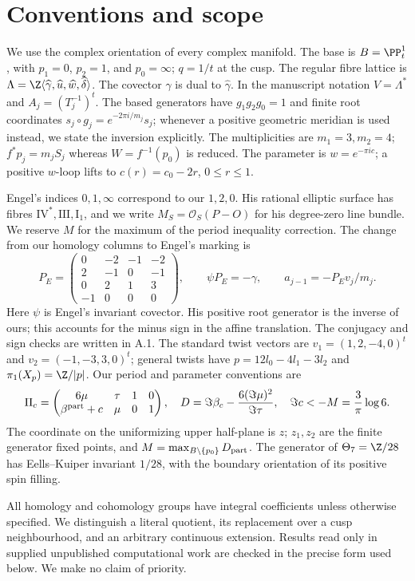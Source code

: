 \section*{Conventions and scope}
\begingroup\small
We use the complex orientation of every complex manifold. The base is
$B=\PP^1_t$, with $p_1=0$, $p_2=1$, and $p_0=\infty$; $q=1/t$ at the cusp.
The regular fibre lattice is
$\Lambda=\Z\langle\widehat\gamma,\widehat u,\widehat w,\widehat\delta\rangle$.
The covector $\gamma$ is dual to $\widehat\gamma$.
In the manuscript notation $V=\Lambda^*$ and $A_j=(T_j^{-1})^t$.
The based generators have $g_1g_2g_0=1$ and finite root coordinates
$s_j\circ g_j=e^{-2\pi i/m_j}s_j$; whenever a positive geometric meridian
is used instead, we state the inversion explicitly.
The multiplicities are $m_1=3,m_2=4$; $f^*p_j=m_jS_j$ whereas $W=f^{-1}(p_0)$
is reduced. The parameter is $w=e^{-\pi i c}$; a positive $w$-loop lifts to
$c(r)=c_0-2r$, $0\leq r\leq1$.

Engel's indices $0,1,\infty$ correspond to our $1,2,0$.
His rational elliptic surface has fibres $\mathrm{IV}^*,\mathrm{III},\mathrm I_1$,
and we write $M_S=\mathcal O_S(P-O)$ for his degree-zero line bundle.
We reserve $M$ for the maximum of the period inequality correction.
The change from our homology columns to Engel's marking is
\[
P_E=\begin{pmatrix}0&-2&-1&-2\\2&-1&0&-1\\0&2&1&3\\-1&0&0&0\end{pmatrix},
\qquad \psi P_E=-\gamma,\qquad a_{j-1}=-P_Ev_j/m_j.
\]
Here $\psi$ is Engel's invariant covector. His positive root generator
is the inverse of ours; this accounts for the minus sign in the affine
translation. The conjugacy and sign checks are written in A.1.
The standard twist vectors are $v_1=(1,2,-4,0)^t$ and
$v_2=(-1,-3,3,0)^t$; general twists have
$p=12l_0-4l_1-3l_2$ and $\pi_1(X_p)=\Z/|p|$.
Our period and parameter conventions are
\[
\Pi_c=\begin{pmatrix}6\mu&\tau&1&0\\\beta^{\rm part}+c&\mu&0&1\end{pmatrix},
\quad D=\Im\beta_c-\frac{6(\Im\mu)^2}{\Im\tau},
\quad\Im c<-M=\frac3\pi\log6.
\]
The coordinate on the uniformizing upper half-plane is $z$;
$z_1,z_2$ are the finite generator fixed points, and
$M=\max_{B\setminus\{p_0\}}D_{\rm part}$.
The generator of $\Theta_7=\Z/28$ has Eells--Kuiper invariant
$1/28$, with the boundary orientation of its positive spin filling.

All homology and cohomology groups have integral coefficients unless
otherwise specified. We distinguish a literal quotient, its replacement
over a cusp neighbourhood, and an arbitrary continuous extension.
Results read only in supplied unpublished computational work are checked
in the precise form used below. We make no claim of priority.
\endgroup
